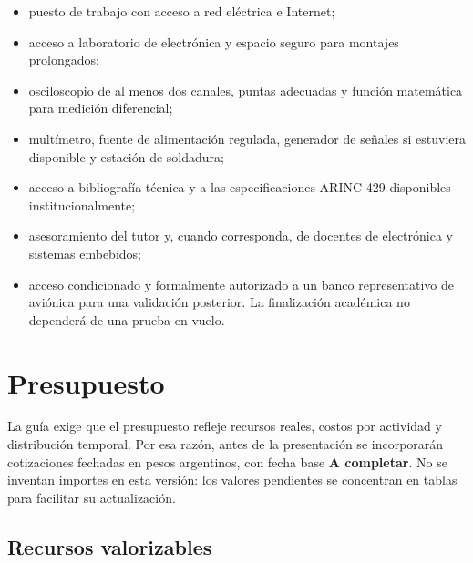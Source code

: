 \documentclass[12pt,a4paper,oneside]{article}
\newcommand{\FechaBasePresupuesto}{A completar}
\begin{document}
\begin{itemize}
  \item puesto de trabajo con acceso a red eléctrica e Internet;
  \item acceso a laboratorio de electrónica y espacio seguro para montajes prolongados;
  \item osciloscopio de al menos dos canales, puntas adecuadas y función matemática para medición diferencial;
  \item multímetro, fuente de alimentación regulada, generador de señales si estuviera disponible y estación de soldadura;
  \item acceso a bibliografía técnica y a las especificaciones ARINC 429 disponibles institucionalmente;
  \item asesoramiento del tutor y, cuando corresponda, de docentes de electrónica y sistemas embebidos;
  \item acceso condicionado y formalmente autorizado a un banco representativo de aviónica para una validación posterior. La finalización académica no dependerá de una prueba en vuelo.
\end{itemize}

\section{Presupuesto}

La guía exige que el presupuesto refleje recursos reales, costos por actividad y distribución temporal. Por esa razón, antes de la presentación se incorporarán cotizaciones fechadas en pesos argentinos, con fecha base \textbf{\FechaBasePresupuesto}. No se inventan importes en esta versión: los valores pendientes se concentran en tablas para facilitar su actualización.

\subsection{Recursos valorizables}
\end{document}
